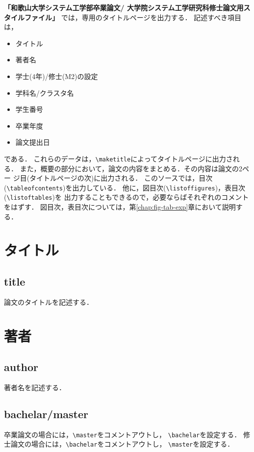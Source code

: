 \documentclass[11pt]{jreport}
\begin{document}
{\bf 「和歌山大学システム工学部卒業論文/
大学院システム工学研究科修士論文用スタイルファイル」}\cite{wusethesis}
では，専用のタイトルページを出力する．
記述すべき項目は，
\begin{itemize}
  \item タイトル
  \item 著者名
  \item 学士(4年)/修士(M2)の設定
  \item 学科名/クラスタ名
  \item 学生番号
  \item 卒業年度
  \item 論文提出日
\end{itemize}
である．
これらのデータは，\verb|\maketitle|によってタイトルページに出力される．
また，概要の部分において，論文の内容をまとめる．その内容は論文の2ペー
ジ目(タイトルページの次)に出力される．
このソースでは，目次(\verb|\tableofcontents|)を出力している．
他に，図目次(\verb|\listoffigures|)，表目次(\verb|\listoftables|)を
出力することもできるので，必要ならばそれぞれのコメントをはずす．
図目次，表目次については，第\ref{chap:fig-tab-exp}章において説明する．

\section{タイトル}
\subsection{title}
論文のタイトルを記述する．

\section{著者}
\subsection{author}
著者名を記述する．

\subsection{bachelar/master}
卒業論文の場合には，\verb|\master|をコメントアウトし，
\verb|\bachelar|を設定する．
修士論文の場合には，\verb|\bachelar|をコメントアウトし，
\verb|\master|を設定する．
\end{document}
